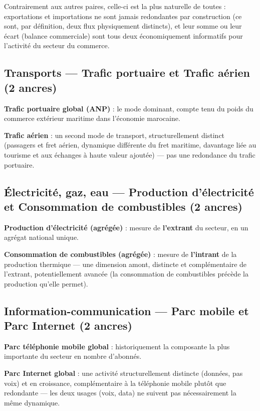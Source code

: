 \documentclass[11pt,a4paper]{article}
\begin{document}
\begin{ancrebox}
Contrairement aux autres paires, celle-ci est la plus naturelle de toutes : exportations et importations ne sont jamais redondantes par construction (ce sont, par définition, deux flux physiquement distincts), et leur somme ou leur écart (balance commerciale) sont tous deux économiquement informatifs pour l'activité du secteur du commerce.
\end{ancrebox}

\subsection{Transports --- Trafic portuaire et Trafic aérien (2 ancres)}

\textbf{Trafic portuaire global (ANP)} : le mode dominant, compte tenu du poids du commerce extérieur maritime dans l'économie marocaine.

\textbf{Trafic aérien} : un second mode de transport, structurellement distinct (passagers et fret aérien, dynamique différente du fret maritime, davantage liée au tourisme et aux échanges à haute valeur ajoutée) --- pas une redondance du trafic portuaire.

\subsection{Électricité, gaz, eau --- Production d'électricité et Consommation de combustibles (2 ancres)}

\textbf{Production d'électricité (agrégée)} : mesure de \textbf{l'extrant} du secteur, en un agrégat national unique.

\textbf{Consommation de combustibles (agrégée)} : mesure de \textbf{l'intrant} de la production thermique --- une dimension amont, distincte et complémentaire de l'extrant, potentiellement avancée (la consommation de combustibles précède la production qu'elle permet).

\subsection{Information-communication --- Parc mobile et Parc Internet (2 ancres)}

\textbf{Parc téléphonie mobile global} : historiquement la composante la plus importante du secteur en nombre d'abonnés.

\textbf{Parc Internet global} : une activité structurellement distincte (données, pas voix) et en croissance, complémentaire à la téléphonie mobile plutôt que redondante --- les deux usages (voix, data) ne suivent pas nécessairement la même dynamique.
\end{document}
